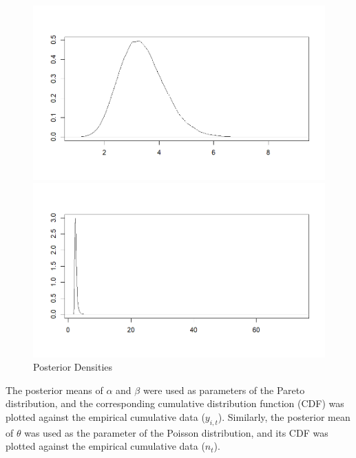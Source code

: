 \documentclass{Class/julia}
\begin{document}
\begin{figure}[!ht]
    \begin{minipage}{0.45\textwidth}
        \centering
        \includegraphics[width=\linewidth]{rytgaard1990/density_theta.png}
        \subcaption{\( \theta \)}
    \end{minipage}%
    \hfill
    \begin{minipage}{0.45\textwidth}
        \centering
        \includegraphics[width=\linewidth]{rytgaard1990/density_E_y.png}
    \end{minipage}
    
    \caption{Posterior Densities}
    \label{fig:1}
\end{figure}

The posterior means of \( \alpha \) and \( \beta \) were used as parameters of the Pareto distribution, and the corresponding cumulative distribution function (CDF) was plotted against the empirical cumulative data (\( y_{i,t} \)). Similarly, the posterior mean of \( \theta \) was used as the parameter of the Poisson distribution, and its CDF was plotted against the empirical cumulative data (\( n_t \)).
\end{document}

